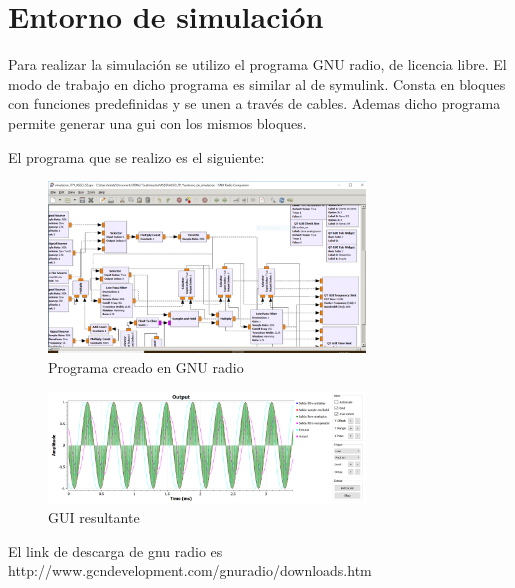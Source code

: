 \documentclass[../../ASSD_TP1_G7.tex]{subfiles}
\begin{document}
\chapter*{Entorno de simulaci\'on}
Para realizar la simulación se utilizo el programa GNU radio, de licencia libre. El modo de trabajo en dicho programa es similar al de symulink. Consta en bloques con funciones predefinidas y se unen a  través de cables. Ademas dicho programa permite generar una gui con los mismos bloques.
\par El programa que se realizo es el siguiente:

\begin{figure}[H]
\centering
\includegraphics[width=0.75\textwidth]{figures/fig2.png}
\caption{Programa creado en GNU radio}
\end{figure}

\begin{figure}[H]
\centering
\includegraphics[width=0.75\textwidth]{figures/fig3.png}
\caption{GUI resultante}\label{fig:gui}
\end{figure}

El link de descarga de gnu radio es http://www.gcndevelopment.com/gnuradio/downloads.htm
\end{document}
